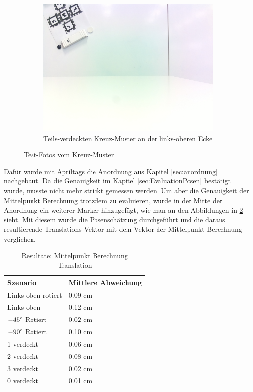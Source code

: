 \begin{figure}[H]
\begin{subfigure}[h]{0.45\textwidth}
        \includegraphics[width=\linewidth]{graphics/edgeExtreme.jpg}
        \caption{Teils-verdeckten Kreuz-Muster an der links-oberen Ecke}
        \label{fig:MittelpunktExtreme}
    \end{subfigure}
    
    \caption{Test-Fotos vom Kreuz-Muster}
\label{fig:TestFotosMittelpunkt}
\end{figure}

Dafür wurde mit Apriltags die Anordnung aus Kapitel \ref{sec:anordnung} nachgebaut. 
Da die Genauigkeit im Kapitel \ref{sec:EvaluationPosen} bestätigt wurde, musste nicht mehr strickt gemessen werden.
Um aber die Genauigkeit der Mittelpunkt Berechnung trotzdem zu evaluieren, wurde in der Mitte der Anordnung ein weiterer Marker hinzugefügt, wie man an den Abbildungen in \ref{fig:TestFotosMittelpunkt} sieht.
Mit diesem wurde die Posenschätzung durchgeführt und die daraus resultierende Translations-Vektor mit dem Vektor der Mittelpunkt Berechnung verglichen.

\begin{table}[!htb]
    \centering
    \caption{Resultate: Mittelpunkt Berechnung Translation}
    \label{tab:MittelpunktTranslation}
        \begin{tabular}{|l|l|}
            \hline
            Szenario &  Mittlere Abweichung\\
            \hline
            Links oben rotiert & 0.09 cm\\
            \hline
            Links oben & 0.12 cm\\
            \hline
            \(-45 \degree\) Rotiert & 0.02 cm\\
            \hline
            \(-90 \degree\) Rotiert& 0.10 cm\\
            \hline
            1 verdeckt & 0.06 cm\\
            \hline
            2 verdeckt & 0.08 cm\\
            \hline
            3 verdeckt & 0.02 cm\\
            \hline
            0 verdeckt & 0.01 cm\\
            \hline
        \end{tabular}
\end{table}

